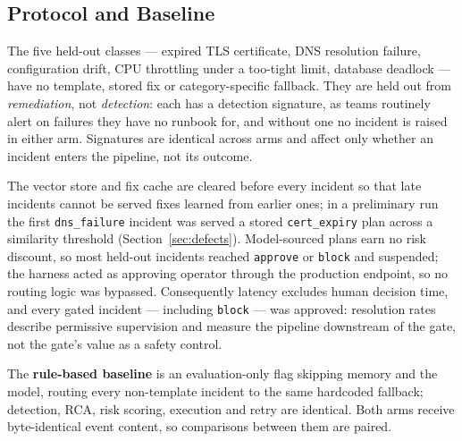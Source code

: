 \documentclass[conference]{IEEEtran}
\begin{document}
\subsection{Protocol and Baseline}
\label{sec:heldout}
\label{sec:heldoutdef}
The five held-out classes --- expired TLS certificate, DNS resolution
failure, configuration drift, CPU throttling under a too-tight limit,
database deadlock --- have no template, stored fix or category-specific
fallback. They are held out from \emph{remediation}, not
\emph{detection}: each has a detection signature, as teams routinely
alert on failures they have no runbook for, and without one no incident
is raised in either arm. Signatures are identical across arms and affect
only whether an incident enters the pipeline, not its outcome.

The vector store and fix cache are cleared before every incident so that
late incidents cannot be served fixes learned from earlier ones; in a
preliminary run the first \texttt{dns\_failure} incident was served a
stored \texttt{cert\_expiry} plan across a similarity threshold
(Section~\ref{sec:defects}). Model-sourced plans earn no risk discount,
so most held-out incidents reached \texttt{approve} or \texttt{block} and
suspended; the harness acted as approving operator through the
production endpoint, so no routing logic was bypassed. Consequently
latency excludes human decision time, and every gated incident ---
including \texttt{block} --- was approved: resolution rates describe
permissive supervision and measure the pipeline downstream of the gate,
not the gate's value as a safety control.

The \textbf{rule-based baseline} is an evaluation-only flag skipping
memory and the model, routing every non-template incident to the same
hardcoded fallback; detection, RCA, risk scoring, execution and retry
are identical. Both arms receive byte-identical event content, so
comparisons between them are paired.
\end{document}
